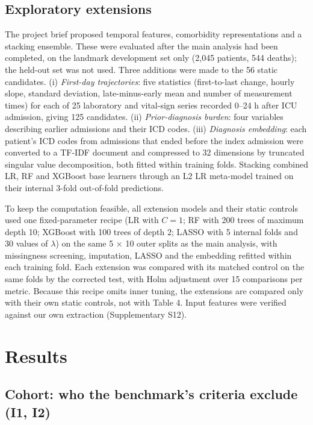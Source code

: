 \hypertarget{exploratory-extensions}{%
\subsection{Exploratory extensions}\label{exploratory-extensions}}

The project brief proposed temporal features, comorbidity representations and a
stacking ensemble. These were evaluated after the main analysis had been
completed, on the landmark development set only (2,045 patients, 544 deaths);
the held-out set was not used. Three additions were made to the 56 static
candidates. (i) \emph{First-day trajectories}: five statistics (first-to-last
change, hourly slope, standard deviation, late-minus-early mean and number of
measurement times) for each of 25 laboratory and vital-sign series recorded
0--24 h after ICU admission, giving 125 candidates. (ii) \emph{Prior-diagnosis
burden}: four variables describing earlier admissions and their ICD codes. (iii)
\emph{Diagnosis embedding}: each patient's ICD codes from admissions that ended
before the index admission were converted to a TF-IDF document and compressed to
32 dimensions by truncated singular value decomposition, both fitted within
training folds. Stacking combined LR, RF and XGBoost base learners through an L2
LR meta-model trained on their internal 3-fold out-of-fold predictions.

To keep the computation feasible, all extension models and their static controls
used one fixed-parameter recipe (LR with \(C = 1\); RF with 200 trees of maximum
depth 10; XGBoost with 100 trees of depth 2; LASSO with 5 internal folds and 30
values of \(\lambda\)) on the same 5 × 10 outer splits as the main analysis,
with missingness screening, imputation, LASSO and the embedding refitted within
each training fold. Each extension was compared with its matched control on the
same folds by the corrected test, with Holm adjustment over 15 comparisons per
metric. Because this recipe omits inner tuning, the extensions are compared only
with their own static controls, not with Table 4. Input features were verified
against our own extraction (Supplementary S12).

\hypertarget{results}{%
\section{Results}\label{results}}

\hypertarget{cohort-who-the-benchmarks-criteria-exclude-i1-i2}{%
\subsection{Cohort: who the benchmark's criteria exclude (I1,
I2)}\label{cohort-who-the-benchmarks-criteria-exclude-i1-i2}}


